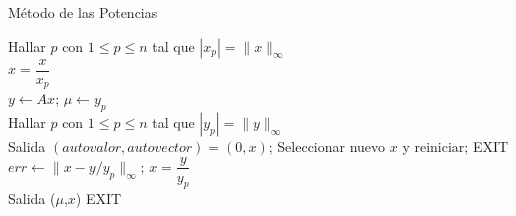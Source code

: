 \documentclass[11pt]{beamer}
\begin{document}
    \begin{frame}{M\'etodo de las Potencias}
\begin{algorithm}[H] 
  \footnotesize
 \caption{Algoritmo de Potencia.}
 Hallar $p$  con $1\leq p \leq n$ tal que $|x_p|=\|x\|_{\infty}$\\
 $x=\dfrac{x}{x_p}$\\
 {
  $y \leftarrow Ax$; $\mu \leftarrow y_p$\\
  Hallar $p$  con $1\leq p \leq n$ tal que $|y_p|=\|y\|_{\infty}$\\
  {
    Salida $(autovalor,autovector) = (0,x)$;  
    Seleccionar nuevo $x$ y reiniciar; EXIT
  }
  $err \leftarrow \|x-y/y_p\|_{\infty}$; 
  $x=\dfrac{y}{y_p}$\\
  {
    Salida ($\mu$,$x$)
    EXIT
  }
 } 
\end{algorithm}
  \end{frame}
\end{document}
